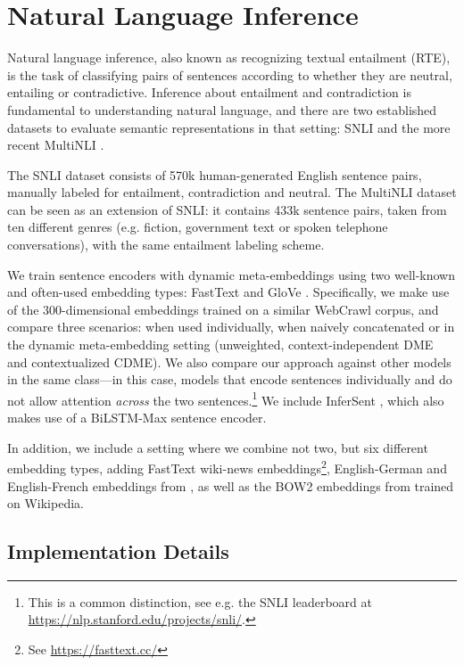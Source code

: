 \documentclass[11pt,a4paper]{article}
\begin{document}
\section{Natural Language Inference}
\label{sec:nli}

Natural language inference, also known as recognizing textual entailment (RTE), is the task of classifying pairs of sentences according to whether they are neutral, entailing or contradictive. Inference about entailment and contradiction is fundamental to understanding natural language, and there are two established datasets to evaluate semantic representations in that setting: SNLI \cite{Bowman:2015emnlp} and the more recent MultiNLI \cite{Williams:2017arxiv}.

The SNLI dataset consists of 570k human-generated English sentence pairs, manually labeled for entailment,
contradiction and neutral.  The MultiNLI dataset can be seen as an extension of SNLI: it contains 433k sentence pairs, taken from ten different genres (e.g. fiction, government text or spoken telephone conversations), with the same entailment labeling scheme.

We train sentence encoders with dynamic meta-embeddings using two well-known and often-used embedding types: FastText \cite{Mikolov:2018lrec,Bojanowski:2016arxiv} and GloVe \cite{Pennington:2014emnlp}. Specifically, we make use of the 300-dimensional embeddings trained on a similar WebCrawl corpus, and compare three scenarios: when used individually, when naively concatenated or in the dynamic meta-embedding setting (unweighted, context-independent DME and contextualized CDME). We also compare our approach against other models in the same class---in this case, models that encode sentences individually and do not allow attention \emph{across} the two sentences.\footnote{This is a common distinction, see e.g. the SNLI leaderboard at \url{https://nlp.stanford.edu/projects/snli/}.} We include InferSent \cite{Conneau:2017emnlp}, which also makes use of a BiLSTM-Max sentence encoder.

In addition, we include a setting where we combine not two, but six different embedding types, adding FastText wiki-news embeddings\footnote{See \url{https://fasttext.cc/}}, English-German and English-French embeddings from , as well as the BOW2 embeddings from  trained on Wikipedia.

\subsection{Implementation Details}
\end{document}
